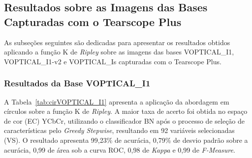 \subsection{Resultados sobre as Imagens das Bases Capturadas com o Tearscope Plus}

As subseções seguintes são dedicadas para apresentar os resultados obtidos aplicando a função K de \textit{Ripley} sobre as imagens das bases VOPTICAL\_I1, VOPTICAL\_I1-v2 e VOPTICAL\_Is capturadas com o Tearscope Plus.

\subsubsection{Resultados da Base VOPTICAL\_I1}

A Tabela~\ref{tab:cirVOPTICAL_I1} apresenta a aplicação da abordagem em círculos sobre a função K de \textit{Ripley}. A maior taxa de acerto foi obtida no espaço de cor (EC) YCbCr, utilizando o classificador BN após o processo de seleção de características pelo \textit{Greedy Stepwise}, resultando em 92 variáveis selecionadas (VS). O resultado apresenta 99,23\% de acurácia, 0,79\% de desvio padrão sobre a acurácia, 0,99 de área sob a curva ROC, 0,98 de \textit{Kappa} e 0,99 de \textit{F-Measure}.

